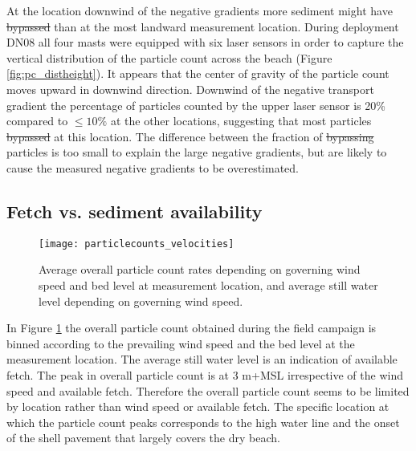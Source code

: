 \documentclass[preprint,12pt,authoryear,a4paper]{elsarticle}
\providecommand{\DIFadd}[1]{{\protect\color{blue}\uwave{#1}}} %
\providecommand{\DIFdel}[1]{{\protect\color{red}\sout{#1}}}                      %
\providecommand{\DIFaddbegin}{} %
\providecommand{\DIFaddend}{} %
\providecommand{\DIFdelbegin}{} %
\providecommand{\DIFdelend}{} %
\providecommand{\DIFaddbeginFL}{} %
\providecommand{\DIFaddendFL}{} %
\providecommand{\DIFdelbeginFL}{} %
\providecommand{\DIFdelendFL}{} %
\begin{document}
At the location downwind of the negative gradients more sediment might
have \DIFdelbegin \DIFdel{bypassed }\DIFdelend \DIFaddbegin \DIFadd{surpassed }\DIFaddend than at the most landward measurement location. During
deployment DN08 all four masts were equipped with six laser sensors in
order to capture the vertical distribution of the particle count
across the beach (Figure \ref{fig:pc_distheight}). It appears that the
center of gravity of the particle count moves upward in downwind
direction. %
Downwind of the negative transport gradient the percentage
of particles counted by the upper laser sensor is 20\% compared to
$\leq 10\%$ at the other locations, suggesting that most particles
\DIFdelbegin \DIFdel{bypassed }\DIFdelend \DIFaddbegin \DIFadd{surpassed }\DIFaddend at this location. The difference between the fraction of
\DIFdelbegin \DIFdel{bypassing }\DIFdelend \DIFaddbegin \DIFadd{surpassing }\DIFaddend particles is too small to explain the large negative
gradients, but are likely to cause the measured negative gradients to
be overestimated.

\subsection{Fetch vs. sediment availability}

\begin{figure}
 \centering
  \DIFdelbeginFL %
\DIFdelendFL \DIFaddbeginFL \texttt{[image: particlecounts\_velocities]}
  \DIFaddendFL \caption{Average overall particle count rates depending on governing
    wind speed and bed level at measurement location, and average
    still water level depending on governing wind speed.}
  \label{fig:pc_velocity}
\end{figure}

In Figure \ref{fig:pc_velocity} the overall particle count obtained
during the field campaign is binned according to the prevailing wind
speed and the bed level at the measurement location. The average still
water level is an indication of available fetch. The peak in overall
particle count is at 3 m+MSL irrespective of the wind speed and
available fetch. Therefore the overall particle count seems to be
limited by location rather than wind speed or available fetch. The
specific location at which the particle count peaks corresponds to the
high water line and the onset of the shell pavement that largely
covers the dry beach.
\end{document}
